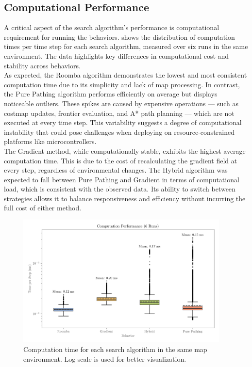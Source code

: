 \subsection{Computational Performance}
A critical aspect of the search algorithm's performance is computational requirement for running the behaviors.
 shows the distribution of computation times per time step for each search algorithm, measured over six runs in the same environment. The data highlights key differences in computational cost and stability across behaviors.\\

As expected, the Roomba algorithm demonstrates the lowest and most consistent computation time due to its simplicity and lack of map processing. In contrast, the Pure Pathing algorithm performs efficiently on average but displays noticeable outliers. These spikes are caused by expensive operations --- such as costmap updates, frontier evaluation, and A* path planning --- which are not executed at every time step. This variability suggests a degree of computational instability that could pose challenges when deploying on resource-constrained platforms like microcontrollers.\\

The Gradient method, while computationally stable, exhibits the highest average computation time. This is due to the cost of recalculating the gradient field at every step, regardless of environmental changes. The Hybrid algorithm was expected to fall between Pure Pathing and Gradient in terms of computational load, which is consistent with the observed data. Its ability to switch between strategies allows it to balance responsiveness and efficiency without incurring the full cost of either method.

\begin{figure}[H]
    \begin{center}
        \includegraphics[width=0.95\textwidth]{./figures/plots/computation-performance-(6-runs).png}
    \end{center}
    \caption{Computation time for each search algorithm in the same map environment. Log scale is used for better visualization.}
    \label{fig:computation-performance}
\end{figure}

